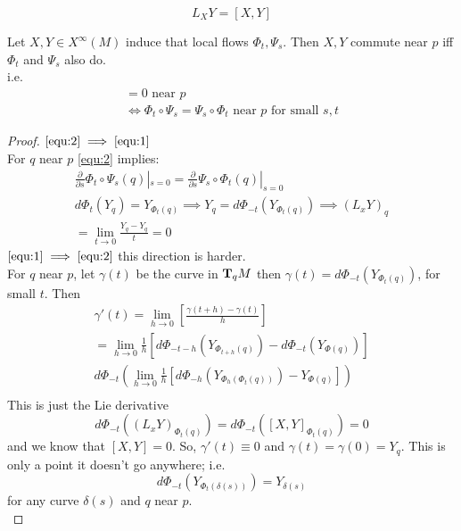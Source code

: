 \begin{teorema}
$$L_XY = [X,Y]$$
\end{teorema}

\begin{teorema} 
    Let $X,Y \in X^\infty (M)$ induce that local flows $\Phi_t,\Psi_s$. Then $X,Y$ commute near $p$ iff $\Phi_t$ and $\Psi_s$ also do.\\
    i.e. 
    \begin{gather}
        [X,Y] = 0 \text{ near } p \label{equ:1}\\
        \iff \Phi_t\circ \Psi_s = \Psi_s \circ \Phi_t  \text{ near } p \text{ for small } s,t \label{equ:2}
    \end{gather}
    \begin{proof}
        $\ref{equ:2} \implies \ref{equ:1}$\\
        For $q$ near $p$ \ref{equ:2} implies:
        \begin{gather*}
        \frac{\partial}{\partial s} \Phi_t\circ \Psi_s(q) | _{s=0} = \frac{\partial }{\partial s} \Psi_s \circ \Phi_t(q) |_{s=0}\\
        d\Phi_t(Y_q) = Y_{\Phi_t(q)} \implies Y_q = d\Phi_{-t} (Y_{\Phi_t(q)}) \implies (L_x Y)_q \\
        = \lim_{t\to 0} \frac{Y_q - Y_q}{t} =0
    \end{gather*}
    $\ref{equ:1} \implies \ref{equ:2}$ this direction is harder.\\
    For $q$ near $p$, let $\gamma(t)$ be the curve in $\text{\textbf{T}}_qM$ then $\gamma(t) = d\Phi_{-t} (Y_{\Phi_t(q)})$, for small $t$. Then 
    \begin{gather*}
    \gamma'(t) = \lim_{h \to 0} \left[ \frac{\gamma(t+h) - \gamma(t) }{h} \right]\\
    = \lim_{h \to 0}\frac{1}{h} \left[ d\Phi_{-t-h} (Y_{\Phi_{t+h}(q)}) -  d\Phi_{-t} (Y_{\Phi(q)})\right]\\
    d\Phi_{-t} \left(\lim_{h\to 0}\frac{1}{h} \left[  d\Phi_{-h}(Y_{\Phi_h(\Phi_t(q))}) -  Y_{\Phi(q)}\right] \right)\\
\end{gather*}
This is just the Lie derivative
$$ d\Phi_{-t} \left((L_x Y)_{\Phi_t(q)}\right) = d\Phi_{-t}\left([X,Y]_{\Phi_t(q)}\right) =0$$
and we know that $[X,Y]=0$. So, $\gamma'(t) \equiv 0$ and $\gamma(t) = \gamma(0) = Y_q$. This is only a point it doesn't go anywhere; i.e. 
$$d\Phi_{-t} \left(Y_{\Phi_t(\delta(s))}\right) = Y_{\delta(s)}$$
    for any curve $\delta(s)$ and $q$ near $p$.\\

\end{proof}
\end{teorema}
